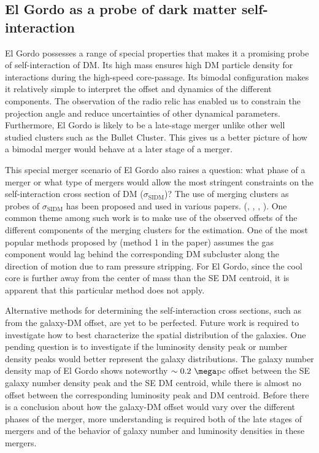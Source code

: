 \subsection{El Gordo as a probe of dark matter self-interaction}
El Gordo possesses a range of special properties that makes it a promising
probe of self-interaction of DM. Its high mass ensures high DM
particle density for interactions during the high-speed core-passage. Its bimodal configuration makes it
relatively simple to interpret the offset and dynamics of the different
components. The observation of the radio relic has enabled us to
constrain the projection angle and reduce uncertainties of other dynamical
parameters. Furthermore, El Gordo is likely to be a late-stage merger
unlike other well studied clusters such as the Bullet Cluster. This gives
us a better picture of how a bimodal merger would behave at a later stage of a merger. \par 
This special merger scenario of El Gordo also raises a question: what phase
of a merger or what type of mergers would allow the most stringent
constraints on the self-interaction cross section of DM ($\sigma_{\text{SIDM}}$)? 
The use of merging clusters as probes of $\sigma_{\text{SIDM}}$ 
has been proposed and used in various papers.
(\citealt{Markevitch2004}, \citealt{Randall2008d}, \citealt{Merten2011},
\citealt{Dawson12}). One common theme among such work is
to make use of the observed offsets of the different components of the
merging clusters for the estimation. One of the most popular methods proposed by
\citealt{Markevitch2004} (method 1 in the paper) assumes the gas component would lag behind the corresponding DM
subcluster along the direction of motion due to ram pressure stripping.   
For El Gordo, since the cool core is further away from the
center of mass than the SE DM centroid, it is apparent that this particular
method does not apply.\par 
Alternative methods for determining the self-interaction cross sections,
such as from the galaxy-DM offset, are yet to be perfected. Future work is
required to investigate how to best characterize the spatial distribution
of the galaxies. One pending question is to investigate if the luminosity
density peak or number density peaks would better represent the galaxy
distributions. The galaxy number density map of El Gordo
 shows noteworthy $\sim0.2~\mega$pc offset between the SE
galaxy number density peak and the SE DM centroid, while there is almost no offset
between the corresponding luminosity peak and DM centroid. 
Before there is a
conclusion about how the galaxy-DM offset would vary over
the different phases of the merger, 
more understanding is required both of the late stages of mergers and of the behavior of galaxy number and luminosity densities in these mergers.


